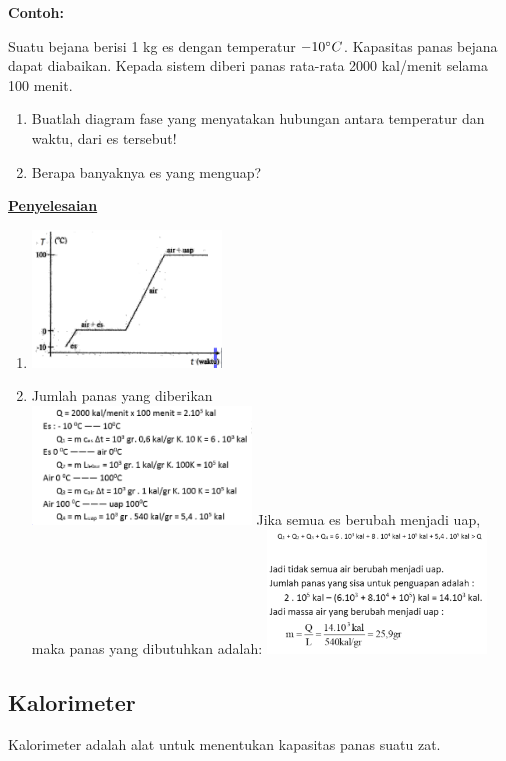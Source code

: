 \documentclass[twocolumn, 11pt]{article}%
\begin{document}
        \textbf{Contoh:}

        Suatu bejana berisi 1 kg es dengan temperatur $-10\degree C$. Kapasitas panas bejana dapat diabaikan. Kepada sistem diberi panas rata-rata 2000 kal/menit selama 100 menit.
        \begin{enumerate}[label=\alph*)]
            \item Buatlah diagram fase yang menyatakan hubungan antara temperatur dan waktu, dari es tersebut!
            \item Berapa banyaknya es yang menguap?
        \end{enumerate}

        \textbf{\underline{Penyelesaian}}
        \begin{enumerate}[label=\alph*)]
            \item 
                \includegraphics[width=190px]{8.png}
            \item Jumlah panas yang diberikan\\
                \includegraphics[width=220px]{9.png}
                Jika semua es berubah menjadi uap, maka panas yang dibutuhkan adalah:
                \includegraphics[width=220px]{10.png}
        \end{enumerate}

    \subsection{Kalorimeter}
        Kalorimeter adalah alat untuk menentukan kapasitas panas suatu zat.
        
\end{document}
